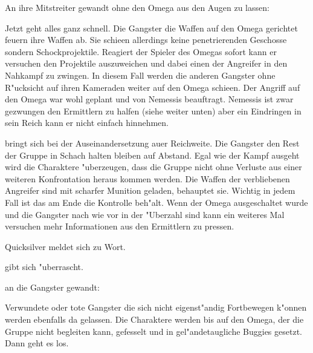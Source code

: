 An ihre Mitstreiter gewandt ohne den Omega aus den Augen zu lassen:


Jetzt geht alles ganz schnell. Die Gangster die Waffen auf den Omega gerichtet feuern ihre Waffen ab. Sie schie\3en allerdings keine penetrierenden Geschosse sondern Schockprojektile. Reagiert der Spieler des Omegas sofort kann er versuchen den Projektile auszuweichen und dabei einen der Angreifer in den Nahkampf zu zwingen. In diesem Fall werden die anderen Gangster ohne R"ucksicht auf ihren Kameraden weiter auf den Omega schie\3en. Der Angriff auf den Omega war wohl geplant und von Nemessis beauftragt. Nemessis ist zwar gezwungen den Ermittlern zu halfen (siehe weiter unten) aber ein Eindringen in sein Reich kann er nicht einfach hinnehmen. 

\xlsn{} bringt sich bei der Auseinandersetzung au\3er Reichweite. Die Gangster den Rest der Gruppe in Schach halten bleiben auf Abstand. Egal wie der Kampf ausgeht wird \xlsn{} die Charaktere "uberzeugen, dass die Gruppe nicht ohne Verluste aus einer weiteren Konfrontation heraus kommen werden. Die Waffen der verbliebenen Angreifer sind mit scharfer Munition geladen, behauptet sie. Wichtig in jedem Fall ist das \xlsn{} am Ende die Kontrolle beh"alt. Wenn der Omega ausgeschaltet wurde und die Gangster nach wie vor in der "Uberzahl sind kann \xlsn{} ein weiteres Mal versuchen mehr Informationen aus den Ermittlern zu pressen.

Quicksilver meldet sich zu Wort. 


\xlsn{} gibt sich "uberrascht. 


\xlsn{} an die Gangster gewandt: 


Verwundete oder tote Gangster die sich nicht eigenst"andig Fortbewegen k"onnen werden ebenfalls da gelassen. Die Charaktere werden bis auf den Omega, der die Gruppe nicht begleiten kann, gefesselt und in gel"andetaugliche Buggies gesetzt. Dann geht es los.

